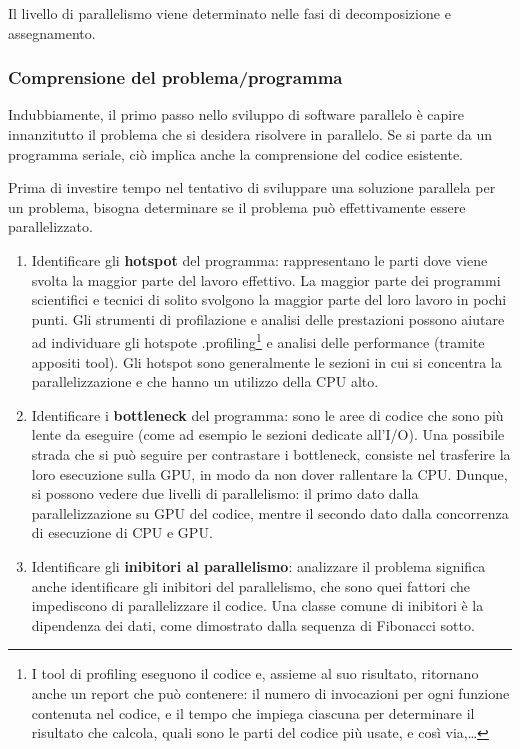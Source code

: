 Il livello di parallelismo viene determinato nelle fasi di decomposizione e assegnamento.

\subsubsection{Comprensione del problema/programma}
Indubbiamente, il primo passo nello sviluppo di software parallelo è capire innanzitutto il problema che si desidera risolvere in parallelo. Se si parte da un programma seriale, ciò implica anche la comprensione del codice esistente.

Prima di investire tempo nel tentativo di sviluppare una soluzione parallela per un problema, bisogna determinare se il problema può effettivamente essere parallelizzato.


\begin{enumerate}
    \item Identificare gli \textbf{hotspot} del programma: rappresentano le parti dove viene svolta la maggior parte del lavoro effettivo. La maggior parte dei programmi scientifici e tecnici di solito svolgono la maggior parte del loro lavoro in pochi punti. Gli strumenti di profilazione e analisi delle prestazioni possono aiutare ad individuare gli hotspote .profiling\footnote{I tool di profiling eseguono il codice e, assieme al suo risultato, ritornano anche un report che può contenere: il numero di invocazioni per ogni funzione contenuta nel codice, e il tempo che impiega ciascuna per determinare il risultato che calcola, quali sono le parti del codice più usate, e così via,\dots} e analisi delle performance (tramite appositi tool). Gli hotspot sono generalmente le sezioni in cui si concentra la parallelizzazione e che hanno un utilizzo della CPU alto.
    \item Identificare i \textbf{bottleneck} del programma: sono le aree di codice che sono più lente da eseguire (come ad esempio le sezioni dedicate all'I/O). Una possibile strada che si può seguire per contrastare i bottleneck, consiste nel trasferire la loro esecuzione sulla GPU, in modo da non dover rallentare la CPU. Dunque, si possono vedere due livelli di parallelismo: il primo dato dalla parallelizzazione su GPU del codice, mentre il secondo dato dalla concorrenza di esecuzione di CPU e GPU.
    \item Identificare gli\textbf{ inibitori al parallelismo}: analizzare il problema significa anche identificare gli inibitori del parallelismo, che sono quei fattori che impediscono di parallelizzare il codice. Una classe comune di inibitori è la dipendenza dei dati, come dimostrato dalla sequenza di Fibonacci sotto.
\end{enumerate}


